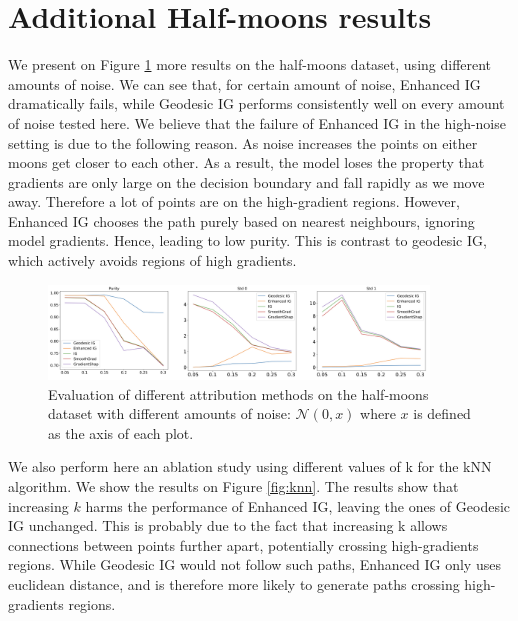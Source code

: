\section{Additional Half-moons results}
\label{app:half-moons}

We present on Figure \ref{fig:noises} more results on the half-moons dataset, using different amounts of noise. We can see that, for certain amount of noise, Enhanced IG dramatically fails, while Geodesic IG performs consistently well on every amount of noise tested here. We believe that the failure of Enhanced IG in the high-noise setting is due to the following reason. As noise increases the points on either moons get closer to each other. As a result, the model loses the property that gradients are only large on the decision boundary and fall rapidly as we move away. Therefore a lot of points are on the high-gradient regions. However, Enhanced IG chooses the path purely based on nearest neighbours, ignoring model gradients. Hence, leading to low purity. This is contrast to geodesic IG, which actively avoids regions of high gradients.

\begin{figure}[ht]
\vskip 0.2in
\begin{center}
\centerline{\includegraphics[width=0.9\textwidth]{figures/noises.png}}
\caption{Evaluation of different attribution methods on the half-moons dataset with different amounts of noise: $\mathcal{N}(0, x)$ where $x$ is defined as the axis of each plot.}
\label{fig:noises}
\end{center}
\vskip -0.2in
\end{figure}

We also perform here an ablation study using different values of k for the kNN algorithm. We show the results on Figure \ref{fig:knn}. The results show that increasing $k$ harms the performance of Enhanced IG, leaving the ones of Geodesic IG unchanged. This is probably due to the fact that increasing k allows connections between points further apart, potentially crossing high-gradients regions. While Geodesic IG would not follow such paths, Enhanced IG only uses euclidean distance, and is therefore more likely to generate paths crossing high-gradients regions.


